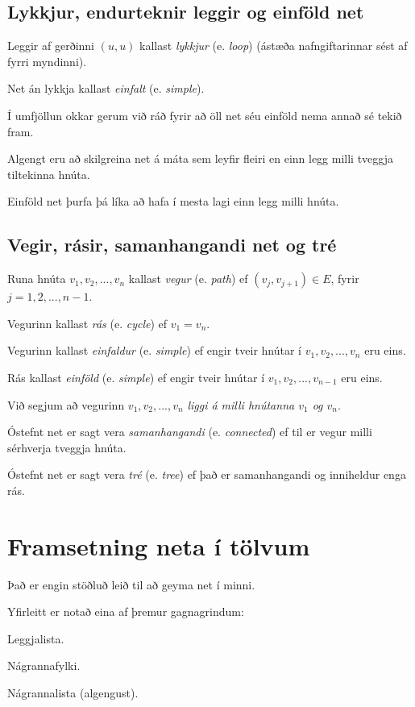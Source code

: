 \subsection{Lykkjur, endurteknir leggir og einföld net}
{
    {
        \item<1-> Leggir af gerðinni $(u, u)$ kallast \emph{lykkjur} (e. \emph{loop}) (ástæða nafngiftarinnar sést af fyrri myndinni).
        \item<2-> Net án lykkja kallast \emph{einfalt} (e. \emph{simple}).
        \item<3-> Í umfjöllun okkar gerum við ráð fyrir að öll net séu einföld nema annað sé tekið fram.
        \item<4-> Algengt eru að skilgreina net á máta sem leyfir fleiri en einn legg milli tveggja tiltekinna hnúta.
        \item<5-> Einföld net þurfa þá líka að hafa í mesta lagi einn legg milli hnúta.
    }
}

\subsection{Vegir, rásir, samanhangandi net og tré}
{
    {
        \item<1-> Runa hnúta $v_1, v_2, ..., v_n$ kallast \emph{vegur} (e. \emph{path}) ef $(v_j, v_{j + 1}) \in E$, fyrir $j = 1, 2, ..., n - 1$.
        \item<2-> Vegurinn kallast \emph{rás} (e. \emph{cycle}) ef $v_1 = v_n$.
        \item<3-> Vegurinn kallast \emph{einfaldur} (e. \emph{simple}) ef engir tveir hnútar í $v_1, v_2, ..., v_n$ eru eins.
        \item<4-> Rás kallast \emph{einföld} (e. \emph{simple}) ef engir tveir hnútar í $v_1, v_2, ..., v_{n - 1}$ eru eins.
        \item<5-> Við segjum að vegurinn $v_1, v_2, ..., v_n$ \emph{liggi á milli hnútanna $v_1$ og $v_n$}.
        \item<6-> Óstefnt net er sagt vera \emph{samanhangandi} (e. \emph{connected}) ef til er vegur milli sérhverja tveggja hnúta.
        \item<7-> Óstefnt net er sagt vera \emph{tré} (e. \emph{tree}) ef það er samanhangandi og inniheldur enga rás.
    }
}

\section{Framsetning neta í tölvum}
{
    {
        \item<1-> Það er engin stöðluð leið til að geyma net í minni.
        \item<2-> Yfirleitt er notað eina af þremur gagnagrindum:
        {
            \item<3-> Leggjalista.
            \item<4-> Nágrannafylki.
            \item<5-> Nágrannalista (algengust).
        }
    }
}

